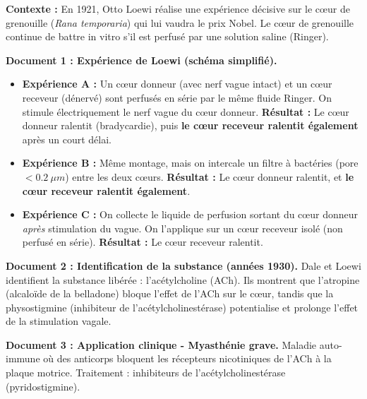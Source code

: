\documentclass[11pt]{article}
\begin{document}
\begin{exercice}
\textbf{Contexte :} En 1921, Otto Loewi réalise une expérience décisive sur le cœur de grenouille (\emph{Rana temporaria}) qui lui vaudra le prix Nobel. Le cœur de grenouille continue de battre in vitro s'il est perfusé par une solution saline (Ringer).

\textbf{Document 1 : Expérience de Loewi (schéma simplifié).}
\begin{itemize}
    \item \textbf{Expérience A :} Un cœur donneur (avec nerf vague intact) et un cœur receveur (dénervé) sont perfusés en série par le même fluide Ringer. On stimule électriquement le nerf vague du cœur donneur. \textbf{Résultat :} Le cœur donneur ralentit (bradycardie), puis \textbf{le cœur receveur ralentit également} après un court délai.
    \item \textbf{Expérience B :} Même montage, mais on intercale un filtre à bactéries (pore $< \SI{0,2}{\mu m}$) entre les deux cœurs. \textbf{Résultat :} Le cœur donneur ralentit, et \textbf{le cœur receveur ralentit également}.
    \item \textbf{Expérience C :} On collecte le liquide de perfusion sortant du cœur donneur \emph{après} stimulation du vague. On l'applique sur un cœur receveur isolé (non perfusé en série). \textbf{Résultat :} Le cœur receveur ralentit.
\end{itemize}

\textbf{Document 2 : Identification de la substance (années 1930).}
Dale et Loewi identifient la substance libérée : l'acétylcholine (ACh). Ils montrent que l'atropine (alcaloïde de la belladone) bloque l'effet de l'ACh sur le cœur, tandis que la physostigmine (inhibiteur de l'acétylcholinestérase) potentialise et prolonge l'effet de la stimulation vagale.

\textbf{Document 3 : Application clinique - Myasthénie grave.}
Maladie auto-immune où des anticorps bloquent les récepteurs nicotiniques de l'ACh à la plaque motrice. Traitement : inhibiteurs de l'acétylcholinestérase (pyridostigmine).


\end{exercice}
\end{document}
